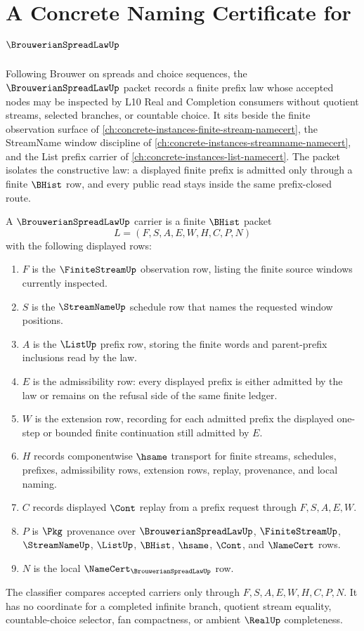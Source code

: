 \chapter{A Concrete Naming Certificate for $\BrouwerianSpreadLawUp$}
\label{ch:concrete-instances-brouwerian-spread-law-namecert}

Following Brouwer on spreads and choice sequences, the $\BrouwerianSpreadLawUp$ packet records a finite prefix law whose accepted nodes may be inspected by L10 Real and Completion consumers without quotient streams, selected branches, or countable choice. It sits beside the finite observation surface of \autoref{ch:concrete-instances-finite-stream-namecert}, the StreamName window discipline of \autoref{ch:concrete-instances-streamname-namecert}, and the List prefix carrier of \autoref{ch:concrete-instances-list-namecert}. The packet isolates the constructive law: a displayed finite prefix is admitted only through a finite $\BHist$ row, and every public read stays inside the same prefix-closed route.

\begin{definition}
\label{def:brouwerian-spread-law-carrier}
A $\BrouwerianSpreadLawUp$ carrier is a finite $\BHist$ packet
$$
L=(F,S,A,E,W,H,C,P,N)
$$
with the following displayed rows:
\begin{enumerate}
\item $F$ is the $\FiniteStreamUp$ observation row, listing the finite source windows currently inspected.
\item $S$ is the $\StreamNameUp$ schedule row that names the requested window positions.
\item $A$ is the $\ListUp$ prefix row, storing the finite words and parent-prefix inclusions read by the law.
\item $E$ is the admissibility row: every displayed prefix is either admitted by the law or remains on the refusal side of the same finite ledger.
\item $W$ is the extension row, recording for each admitted prefix the displayed one-step or bounded finite continuation still admitted by $E$.
\item $H$ records componentwise $\hsame$ transport for finite streams, schedules, prefixes, admissibility rows, extension rows, replay, provenance, and local naming.
\item $C$ records displayed $\Cont$ replay from a prefix request through $F,S,A,E,W$.
\item $P$ is $\Pkg$ provenance over $\BrouwerianSpreadLawUp$, $\FiniteStreamUp$, $\StreamNameUp$, $\ListUp$, $\BHist$, $\hsame$, $\Cont$, and $\NameCert$ rows.
\item $N$ is the local $\NameCert_{\BrouwerianSpreadLawUp}$ row.
\end{enumerate}
The classifier compares accepted carriers only through $F,S,A,E,W,H,C,P,N$. It has no coordinate for a completed infinite branch, quotient stream equality, countable-choice selector, fan compactness, or ambient $\RealUp$ completeness.
\end{definition}

